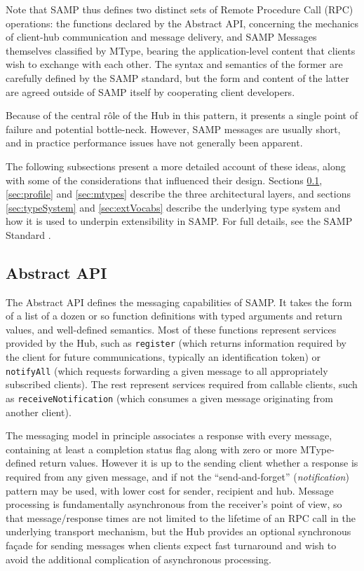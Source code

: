 \documentclass[5p]{elsarticle}
\begin{document}
Note that SAMP thus defines two distinct sets of
Remote Procedure Call (RPC) operations:
the functions declared by the Abstract API,
concerning the mechanics of client-hub communication and message delivery,
and SAMP Messages themselves classified by MType,
bearing the application-level content that clients wish
to exchange with each other.
The syntax and semantics of the former are carefully defined by the
SAMP standard, but the form and content of the latter are
agreed outside of SAMP itself by cooperating client developers.

Because of the central r\^{o}le of the Hub in this pattern,
it presents a single point of failure and potential bottle-neck.
However, SAMP messages are usually short,
and in practice performance issues have not generally been apparent.

The following subsections present a more detailed account of
these ideas, along with some of the considerations that influenced
their design.
Sections \ref{sec:abstractApi}, \ref{sec:profile} and \ref{sec:mtypes}
describe the three architectural layers,
and sections \ref{sec:typeSystem} and \ref{sec:extVocabs}
describe the underlying type system and how it is used to underpin
extensibility in SAMP.
For full details, see the SAMP Standard \citep{samp_std}.

\subsection{Abstract API} \label{sec:abstractApi}

The Abstract API defines the messaging capabilities of SAMP.
It takes the form of a list of a dozen or so function definitions
with typed arguments and return values, and well-defined semantics.
Most of these functions represent services provided by the Hub, such as
{\tt register} (which returns information required by the
client for future communications, typically an identification token)
or {\tt notifyAll} (which requests forwarding a given message to
all appropriately subscribed clients).
The rest represent services required from callable clients, such as
{\tt receiveNotification} (which consumes a given message originating
from another client).

The messaging model in principle associates
a response with every message, containing at least a completion
status flag along with zero or more MType-defined return values.
However it is up to the sending client whether a response is
required from any given message, and if not the ``send-and-forget''
({\em notification\/}) pattern may be used,
with lower cost for sender, recipient and hub.
Message processing is fundamentally asynchronous from the
receiver's point of view, so that message/response times are
not limited to the lifetime of an RPC call in the underlying
transport mechanism, but the Hub provides an optional synchronous
fa\c{c}ade for sending messages when clients expect fast turnaround
and wish to avoid the additional complication of asynchronous processing.
\end{document}
